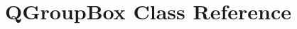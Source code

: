 \hypertarget{classGUI_1_1QtGui_1_1QGroupBox}{}\section{Q\+Group\+Box Class Reference}
\label{classGUI_1_1QtGui_1_1QGroupBox}

